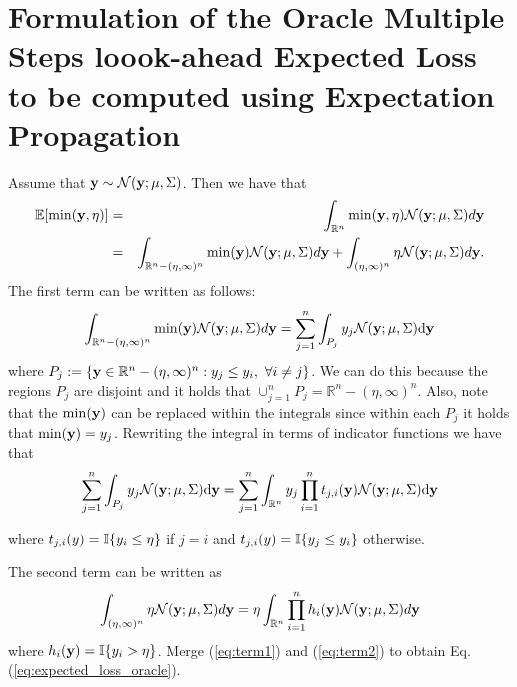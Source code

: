 \documentclass[twoside]{article}
\newcommand{\ud}{\mathrm{d}}
\newcommand{\E}{\mathbb{E}}
\newcommand{\N}{\mathcal{N}}
\newcommand{\IR}{\mathbb{R}}
\begin{document}
\vspace{1cm}
\section{Formulation of the Oracle Multiple Steps loook-ahead Expected Loss to be computed using Expectation Propagation}
Assume that $\dataVector \sim \N(\dataVector; \mu, \Sigma)$. Then we have that
\begin{eqnarray}\nonumber
\E[\min (\dataVector,\eta)] & = & \int_{\IR^n} \min (\dataVector,\eta)  \N(\dataVector; \mu, \Sigma) d\dataVector\\ \nonumber
& = & \int_{\IR^n - (\eta,\infty)^n } \min (\dataVector)  \N(\dataVector; \mu, \Sigma) d\dataVector + \int_{(\eta,\infty)^n} \eta  \N(\dataVector; \mu, \Sigma) d\dataVector.  \nonumber
\end{eqnarray}
The first term can be written as follows:
\begin{equation}
 \int_{\IR^n - (\eta,\infty)^n } \min (\dataVector)  \N(\dataVector; \mu, \Sigma) d\dataVector  =    \sum_{j=1}^n \int_{P_j} \dataScalar_j \N(\dataVector; \mu, \Sigma) \ud \dataVector \nonumber
\end{equation}\nonumber
where $P_j := \{ \dataVector \in\IR^n - (\eta,\infty)^n  : \dataScalar_j \leq \dataScalar_i,\,\, \forall i \neq j \}$. We can do this because the regions $P_j$ are disjoint and it holds that $\cup_{j=1}^{n}P_j = \IR^n - (\eta,\infty)^n $.  Also, note that the $\min(\mathbf{y})$ can be replaced within the integrals since within each $P_j$ it holds that $\min(\mathbf{y}) = y_j$. Rewriting the integral in terms of indicator functions we have that
\begin{eqnarray}\label{eq:term1}
 \sum_{j=1}^n \int_{P_j} \dataScalar_j \N(\dataVector; \mu, \Sigma) \ud \dataVector   =  \sum_{j=1}^n  \int_{\IR^n} \dataScalar_j \prod_{i=1}^n t_{j,i}(\dataVector) \N(\dataVector; \mu, \Sigma) \ud \dataVector 
\end{eqnarray}

where $t_{j,i}(y) =\mathbb{I}\{y_i \leq\eta\}$ if $j=i$ and $t_{j,i}(y) =\mathbb{I}\{y_j \leq y_i \}$ otherwise.

The second term can be written as
\begin{equation}\label{eq:term2}
 \int_{(\eta,\infty)^n } \eta  \N(\dataVector; \mu, \Sigma) d\dataVector = \eta\int_{\IR^n} \prod_{i=1}^nh_i(\dataVector) \N(\dataVector; \mu, \Sigma) d\dataVector
\end{equation}
where $h_i(\mathbf{y}) = \mathbb{I}\{y_i>\eta\}$.  Merge (\ref{eq:term1}) and (\ref{eq:term2}) to obtain Eq.  (\ref{eq:expected_loss_oracle}).
 
\end{document}
